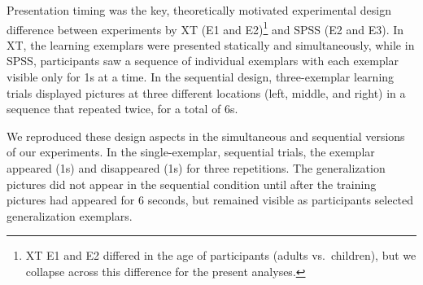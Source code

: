 \documentclass[english,floatsintext,man]{apa6}
\theoremstyle{definition}
\theoremstyle{definition}
\theoremstyle{remark}
\begin{document}
Presentation timing was the key, theoretically motivated experimental
design difference between experiments by XT (E1 and
E2)\footnote{XT E1 and E2 differed in the age of participants (adults vs.\ children), but we collapse across this difference for the present analyses.}
and SPSS (E2 and E3). In XT, the learning exemplars were presented
statically and simultaneously, while in SPSS, participants saw a
sequence of individual exemplars with each exemplar visible only for 1s
at a time. In the sequential design, three-exemplar learning trials
displayed pictures at three different locations (left, middle, and
right) in a sequence that repeated twice, for a total of 6s.

We reproduced these design aspects in the simultaneous and sequential
versions of our experiments. In the single-exemplar, sequential trials,
the exemplar appeared (1s) and disappeared (1s) for three repetitions.
The generalization pictures did not appear in the sequential condition
until after the training pictures had appeared for 6 seconds, but
remained visible as participants selected generalization exemplars.
\end{document}

